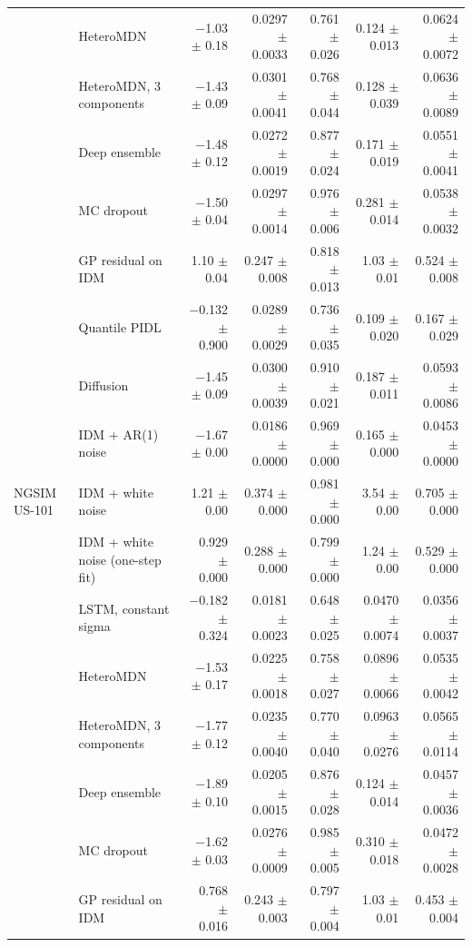 \begin{longtable}{llrrrrr}
 & HeteroMDN & $-$1.03 $\pm$ 0.18 & 0.0297 $\pm$ 0.0033 & 0.761 $\pm$ 0.026 & 0.124 $\pm$ 0.013 & 0.0624 $\pm$ 0.0072 \\
 & HeteroMDN, 3 components & $-$1.43 $\pm$ 0.09 & 0.0301 $\pm$ 0.0041 & 0.768 $\pm$ 0.044 & 0.128 $\pm$ 0.039 & 0.0636 $\pm$ 0.0089 \\
 & Deep ensemble & $-$1.48 $\pm$ 0.12 & 0.0272 $\pm$ 0.0019 & 0.877 $\pm$ 0.024 & 0.171 $\pm$ 0.019 & 0.0551 $\pm$ 0.0041 \\
 & MC dropout & $-$1.50 $\pm$ 0.04 & 0.0297 $\pm$ 0.0014 & 0.976 $\pm$ 0.006 & 0.281 $\pm$ 0.014 & 0.0538 $\pm$ 0.0032 \\
 & GP residual on IDM & 1.10 $\pm$ 0.04 & 0.247 $\pm$ 0.008 & 0.818 $\pm$ 0.013 & 1.03 $\pm$ 0.01 & 0.524 $\pm$ 0.008 \\
 & Quantile PIDL & $-$0.132 $\pm$ 0.900 & 0.0289 $\pm$ 0.0029 & 0.736 $\pm$ 0.035 & 0.109 $\pm$ 0.020 & 0.167 $\pm$ 0.029 \\
 & Diffusion & $-$1.45 $\pm$ 0.09 & 0.0300 $\pm$ 0.0039 & 0.910 $\pm$ 0.021 & 0.187 $\pm$ 0.011 & 0.0593 $\pm$ 0.0086 \\
 & IDM + AR(1) noise & $-$1.67 $\pm$ 0.00 & 0.0186 $\pm$ 0.0000 & 0.969 $\pm$ 0.000 & 0.165 $\pm$ 0.000 & 0.0453 $\pm$ 0.0000 \\
\midrule
NGSIM US-101 & IDM + white noise & 1.21 $\pm$ 0.00 & 0.374 $\pm$ 0.000 & 0.981 $\pm$ 0.000 & 3.54 $\pm$ 0.00 & 0.705 $\pm$ 0.000 \\
 & IDM + white noise (one-step fit) & 0.929 $\pm$ 0.000 & 0.288 $\pm$ 0.000 & 0.799 $\pm$ 0.000 & 1.24 $\pm$ 0.00 & 0.529 $\pm$ 0.000 \\
 & LSTM, constant sigma & $-$0.182 $\pm$ 0.324 & 0.0181 $\pm$ 0.0023 & 0.648 $\pm$ 0.025 & 0.0470 $\pm$ 0.0074 & 0.0356 $\pm$ 0.0037 \\
 & HeteroMDN & $-$1.53 $\pm$ 0.17 & 0.0225 $\pm$ 0.0018 & 0.758 $\pm$ 0.027 & 0.0896 $\pm$ 0.0066 & 0.0535 $\pm$ 0.0042 \\
 & HeteroMDN, 3 components & $-$1.77 $\pm$ 0.12 & 0.0235 $\pm$ 0.0040 & 0.770 $\pm$ 0.040 & 0.0963 $\pm$ 0.0276 & 0.0565 $\pm$ 0.0114 \\
 & Deep ensemble & $-$1.89 $\pm$ 0.10 & 0.0205 $\pm$ 0.0015 & 0.876 $\pm$ 0.028 & 0.124 $\pm$ 0.014 & 0.0457 $\pm$ 0.0036 \\
 & MC dropout & $-$1.62 $\pm$ 0.03 & 0.0276 $\pm$ 0.0009 & 0.985 $\pm$ 0.005 & 0.310 $\pm$ 0.018 & 0.0472 $\pm$ 0.0028 \\
 & GP residual on IDM & 0.768 $\pm$ 0.016 & 0.243 $\pm$ 0.003 & 0.797 $\pm$ 0.004 & 1.03 $\pm$ 0.01 & 0.453 $\pm$ 0.004 \\

\end{longtable}
